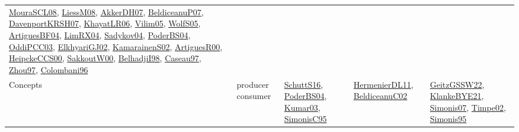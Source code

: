 {\begin{longtable}{lp{3cm}>{\raggedright}p{6cm}>{\raggedright}p{6cm}p{8cm}}
\href{papers/MouraSCL08.pdf}{MouraSCL08}\cite{MouraSCL08}, \href{articles/LiessM08.pdf}{LiessM08}\cite{LiessM08}, \href{papers/AkkerDH07.pdf}{AkkerDH07}\cite{AkkerDH07}, \href{papers/BeldiceanuP07.pdf}{BeldiceanuP07}\cite{BeldiceanuP07}, \href{papers/DavenportKRSH07.pdf}{DavenportKRSH07}\cite{DavenportKRSH07}, \href{articles/KhayatLR06.pdf}{KhayatLR06}\cite{KhayatLR06}, \href{papers/Vilim05.pdf}{Vilim05}\cite{Vilim05}, \href{papers/WolfS05.pdf}{WolfS05}\cite{WolfS05}, \href{papers/ArtiguesBF04.pdf}{ArtiguesBF04}\cite{ArtiguesBF04}, \href{papers/LimRX04.pdf}{LimRX04}\cite{LimRX04}, \href{papers/Sadykov04.pdf}{Sadykov04}\cite{Sadykov04}, \href{articles/PoderBS04.pdf}{PoderBS04}\cite{PoderBS04}, \href{papers/OddiPCC03.pdf}{OddiPCC03}\cite{OddiPCC03}, \href{papers/ElkhyariGJ02.pdf}{ElkhyariGJ02}\cite{ElkhyariGJ02}, \href{papers/KamarainenS02.pdf}{KamarainenS02}\cite{KamarainenS02}, \href{articles/ArtiguesR00.pdf}{ArtiguesR00}\cite{ArtiguesR00}, \href{articles/HeipckeCCS00.pdf}{HeipckeCCS00}\cite{HeipckeCCS00}, \href{articles/SakkoutW00.pdf}{SakkoutW00}\cite{SakkoutW00}, \href{articles/BelhadjiI98.pdf}{BelhadjiI98}\cite{BelhadjiI98}, \href{papers/Caseau97.pdf}{Caseau97}\cite{Caseau97}, \href{articles/Zhou97.pdf}{Zhou97}\cite{Zhou97}, \href{papers/Colombani96.pdf}{Colombani96}\cite{Colombani96}\\
Concepts & producer consumer & \href{papers/SchuttS16.pdf}{SchuttS16}\cite{SchuttS16}, \href{articles/PoderBS04.pdf}{PoderBS04}\cite{PoderBS04}, \href{papers/Kumar03.pdf}{Kumar03}\cite{Kumar03}, \href{papers/SimonisC95.pdf}{SimonisC95}\cite{SimonisC95} & \href{papers/HermenierDL11.pdf}{HermenierDL11}\cite{HermenierDL11}, \href{papers/BeldiceanuC02.pdf}{BeldiceanuC02}\cite{BeldiceanuC02} & \href{papers/GeitzGSSW22.pdf}{GeitzGSSW22}\cite{GeitzGSSW22}, \href{papers/KlankeBYE21.pdf}{KlankeBYE21}\cite{KlankeBYE21}, \href{articles/Simonis07.pdf}{Simonis07}\cite{Simonis07}, \href{articles/Timpe02.pdf}{Timpe02}\cite{Timpe02}, \href{papers/Simonis95.pdf}{Simonis95}\cite{Simonis95}\\

\end{longtable}}
